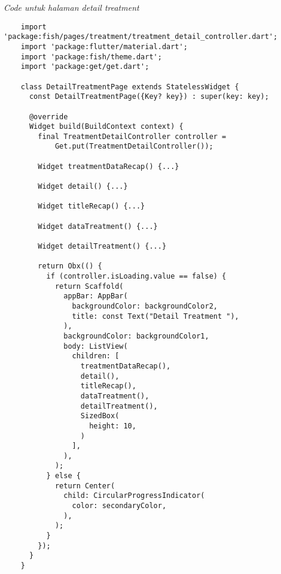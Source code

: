 	\textit{Code untuk halaman detail treatment}
	\begin{lstlisting}
    import 'package:fish/pages/treatment/treatment_detail_controller.dart';
    import 'package:flutter/material.dart';
    import 'package:fish/theme.dart';
    import 'package:get/get.dart';
    
    class DetailTreatmentPage extends StatelessWidget {
      const DetailTreatmentPage({Key? key}) : super(key: key);
    
      @override
      Widget build(BuildContext context) {
        final TreatmentDetailController controller =
            Get.put(TreatmentDetailController());
    
        Widget treatmentDataRecap() {...}
    
        Widget detail() {...}
    
        Widget titleRecap() {...}
    
        Widget dataTreatment() {...}
    
        Widget detailTreatment() {...}
    
        return Obx(() {
          if (controller.isLoading.value == false) {
            return Scaffold(
              appBar: AppBar(
                backgroundColor: backgroundColor2,
                title: const Text("Detail Treatment "),
              ),
              backgroundColor: backgroundColor1,
              body: ListView(
                children: [
                  treatmentDataRecap(),
                  detail(),
                  titleRecap(),
                  dataTreatment(),
                  detailTreatment(),
                  SizedBox(
                    height: 10,
                  )
                ],
              ),
            );
          } else {
            return Center(
              child: CircularProgressIndicator(
                color: secondaryColor,
              ),
            );
          }
        });
      }
    }    
	\end{lstlisting}
	\clearpage

